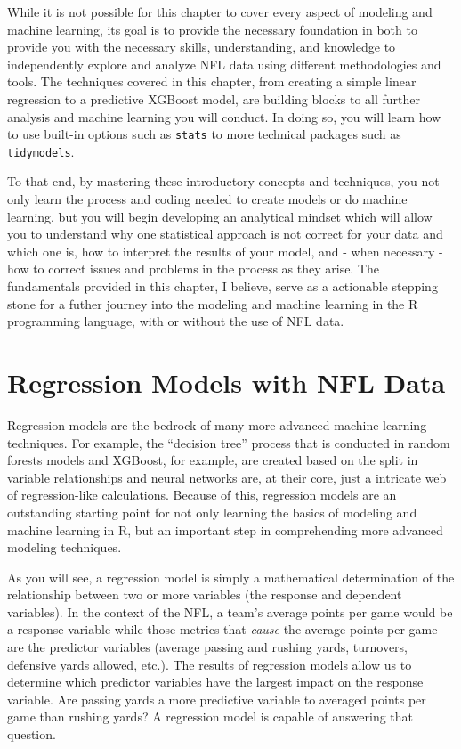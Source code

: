 \documentclass[
  letterpaper,
]{krantz}
\begin{document}
While it is not possible for this chapter to cover every aspect of
modeling and machine learning, its goal is to provide the necessary
foundation in both to provide you with the necessary skills,
understanding, and knowledge to independently explore and analyze NFL
data using different methodologies and tools. The techniques covered in
this chapter, from creating a simple linear regression to a predictive
XGBoost model, are building blocks to all further analysis and machine
learning you will conduct. In doing so, you will learn how to use
built-in options such as \texttt{stats} to more technical packages such
as \texttt{tidymodels}.

To that end, by mastering these introductory concepts and techniques,
you not only learn the process and coding needed to create models or do
machine learning, but you will begin developing an analytical mindset
which will allow you to understand why one statistical approach is not
correct for your data and which one is, how to interpret the results of
your model, and - when necessary - how to correct issues and problems in
the process as they arise. The fundamentals provided in this chapter, I
believe, serve as a actionable stepping stone for a futher journey into
the modeling and machine learning in the R programming language, with or
without the use of NFL data.

\hypertarget{regression-models-with-nfl-data}{%
\section{Regression Models with NFL
Data}\label{regression-models-with-nfl-data}}

Regression models are the bedrock of many more advanced machine learning
techniques. For example, the ``decision tree'' process that is conducted
in random forests models and XGBoost, for example, are created based on
the split in variable relationships and neural networks are, at their
core, just a intricate web of regression-like calculations. Because of
this, regression models are an outstanding starting point for not only
learning the basics of modeling and machine learning in R, but an
important step in comprehending more advanced modeling techniques.

As you will see, a regression model is simply a mathematical
determination of the relationship between two or more variables (the
response and dependent variables). In the context of the NFL, a team's
average points per game would be a response variable while those metrics
that \emph{cause} the average points per game are the predictor
variables (average passing and rushing yards, turnovers, defensive yards
allowed, etc.). The results of regression models allow us to determine
which predictor variables have the largest impact on the response
variable. Are passing yards a more predictive variable to averaged
points per game than rushing yards? A regression model is capable of
answering that question.
\end{document}

